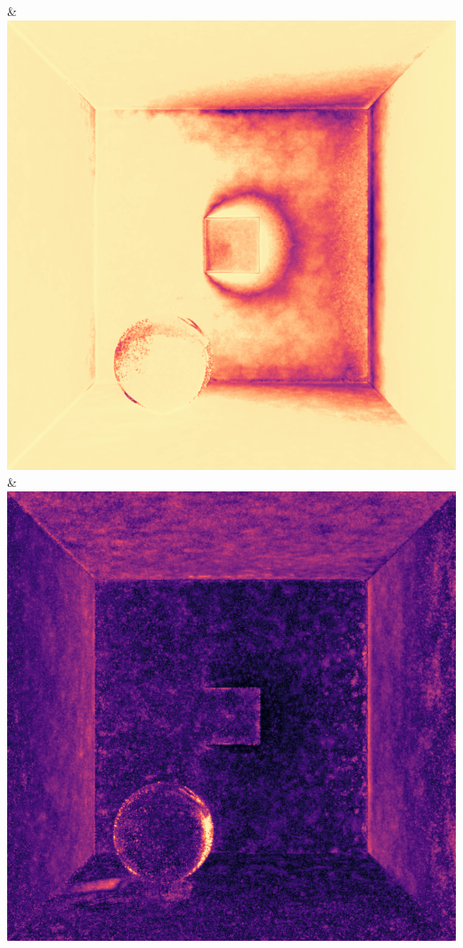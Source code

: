 & \includegraphics[width=\linewidth]{figures/py/tests/quality_comparison/nrc+lt_1spp_ajar_caustic_flip.png}
& \includegraphics[width=\linewidth]{figures/py/tests/quality_comparison/nrc+sppc_1spp_ajar_caustic_flip.png}
